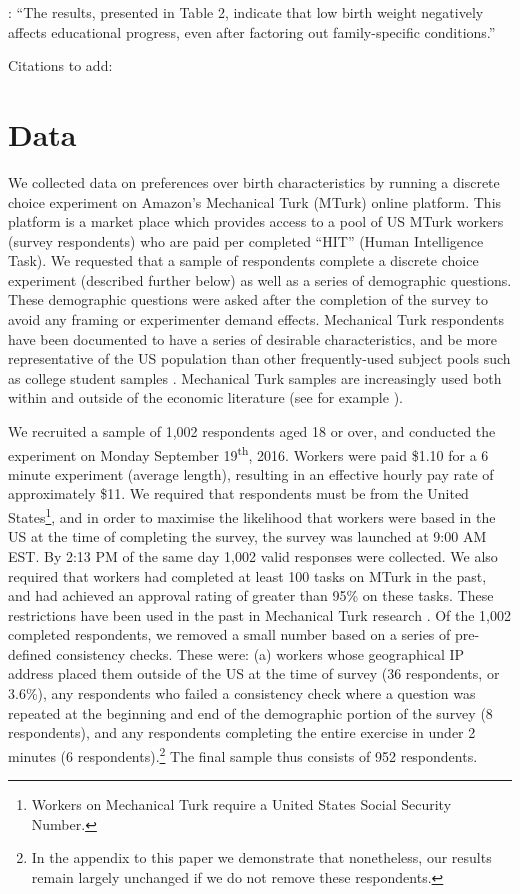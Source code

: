 \documentclass[a4paper, 11pt]{article}
\begin{document}
\begin{spacing}{1.4}
\citet{ConleyBennet2000}: ``The results, presented in Table 2, indicate
that low birth weight negatively affects educational progress, even
after factoring out family-specific conditions.''

Citations to add: \citet{CookFletcher2015,Bharadwajetal2015,Fletcher2011}

\section{Data}
We collected data on preferences over birth characteristics by running a
discrete choice experiment on Amazon's Mechanical Turk (MTurk) online platform.
This platform is a market place which provides access to a pool of US MTurk
workers (survey respondents) who are paid per completed ``HIT'' (Human
Intelligence Task).  We requested that a sample of respondents complete a
discrete choice experiment (described further below) as well as a series of
demographic questions.  These demographic questions were asked after the
completion of the survey to avoid any framing or experimenter demand effects.
Mechanical Turk respondents have been documented to have a series of desirable
characteristics, and be more representative of the US population than other
frequently-used subject pools such as college student samples
\citep{Berinskyetal2012}.  Mechanical Turk samples are increasingly used both
within and outside of the economic literature (see for example
\citet{Kuziemkoetal2015,Jordanetal2016}).

We recruited a sample of 1,002 respondents aged 18 or over, and conducted
the experiment on Monday September 19\textsuperscript{th}, 2016.  Workers
were paid \$1.10 for a 6 minute experiment (average length), resulting in
an effective hourly pay rate of approximately \$11.  We required that
respondents must be from the United States\footnote{Workers on Mechanical
  Turk require a United States Social Security Number.}, and in order to
maximise the likelihood that workers were based in the US at the time of
completing the survey, the survey was launched at 9:00 AM EST.  By 2:13 PM
of the same day 1,002 valid responses were collected.  We also required
that workers had completed at least 100 tasks on MTurk in the past, and
had achieved an approval rating of greater than 95\% on these tasks.
These restrictions have been used in the past in Mechanical Turk research
\citep{Berinskyetal2012,Francis-TanMialon2015}.  Of the 1,002 completed
respondents, we removed a small number based on a series of pre-defined
consistency checks.  These were: (a) workers whose geographical IP address
placed them outside of the US at the time of survey (36 respondents, or
3.6\%), any respondents who failed a consistency check where a question was
repeated at the beginning and end of the demographic portion of the survey
(8 respondents), and any respondents completing the entire exercise in
under 2 minutes (6 respondents).\footnote{In the appendix to this paper we
  demonstrate that nonetheless, our results remain largely unchanged if we
  do not remove these respondents.}  The final sample thus consists of 952
respondents.


\end{spacing}
\end{document}
